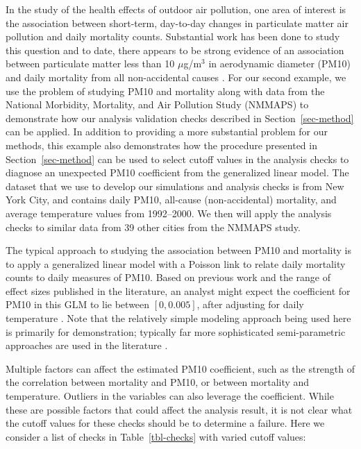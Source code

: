 \documentclass[
  12pt,
]{interact}
\begin{document}
In the study of the health effects of outdoor air pollution, one area of
interest is the association between short-term, day-to-day changes in
particulate matter air pollution and daily mortality counts. Substantial
work has been done to study this question and to date, there appears to
be strong evidence of an association between particulate matter less
than 10 \(\mu\)g/m\(^3\) in aerodynamic diameter (PM10) and daily
mortality from all non-accidental causes \citep{samet2000fine}. For our
second example, we use the problem of studying PM10 and mortality along
with data from the National Morbidity, Mortality, and Air Pollution
Study (NMMAPS) to demonstrate how our analysis validation checks
described in Section~\ref{sec-method} can be applied. In addition to
providing a more substantial problem for our methods, this example also
demonstrates how the procedure presented in Section~\ref{sec-method} can
be used to select cutoff values in the analysis checks to diagnose an
unexpected PM10 coefficient from the generalized linear model. The
dataset that we use to develop our simulations and analysis checks is
from New York City, and contains daily PM10, all-cause (non-accidental)
mortality, and average temperature values from 1992--2000. We then will
apply the analysis checks to similar data from 39 other cities from the
NMMAPS study.

The typical approach to studying the association between PM10 and
mortality is to apply a generalized linear model with a Poisson link to
relate daily mortality counts to daily measures of PM10. Based on
previous work and the range of effect sizes published in the literature,
an analyst might expect the coefficient for PM10 in this GLM to lie
between \([0, 0.005]\), after adjusting for daily temperature
\citep{samet2000fine, welty2005acute}. Note that the relatively simple
modeling approach being used here is primarily for demonstration;
typically far more sophisticated semi-parametric approaches are used in
the literature \citep{peng2006model}.

Multiple factors can affect the estimated PM10 coefficient, such as the
strength of the correlation between mortality and PM10, or between
mortality and temperature. Outliers in the variables can also leverage
the coefficient. While these are possible factors that could affect the
analysis result, it is not clear what the cutoff values for these checks
should be to determine a failure. Here we consider a list of checks in
Table~\ref{tbl-checks} with varied cutoff values:
\end{document}
